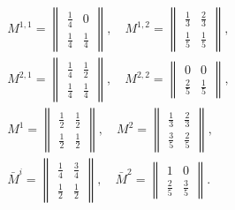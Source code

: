 \documentclass[10pt]{article}
\begin{document}
\[

\begin{aligned}

& M^{1,1}=\left\|\begin{array}{ll}

\frac{1}{4} & 0 \\

\frac{1}{4} & \frac{1}{4}

\end{array}\right\|, \quad M^{1,2}=\left\|\begin{array}{cc}

\frac{1}{3} & \frac{2}{3} \\

\frac{1}{5} & \frac{1}{5}

\end{array}\right\|, \\

& M^{2,1}=\left\|\begin{array}{ll}

\frac{1}{4} & \frac{1}{2} \\

\frac{1}{4} & \frac{1}{4}

\end{array}\right\|, \quad M^{2,2}=\left\|\begin{array}{cc}

0 & 0 \\

\frac{2}{5} & \frac{1}{5}

\end{array}\right\| \text {, } \\

& M^{1}=\left\|\begin{array}{ll}

\frac{1}{2} & \frac{1}{2} \\

\frac{1}{2} & \frac{1}{2}

\end{array}\right\|, \quad M^{2}=\left\|\begin{array}{cc}

\frac{1}{3} & \frac{2}{3} \\

\frac{3}{5} & \frac{2}{5}

\end{array}\right\|, \\

& \bar{M}^{i}=\left\|\begin{array}{cc}

\frac{1}{4} & \frac{3}{4} \\

\frac{1}{2} & \frac{1}{2}

\end{array}\right\|, \quad \bar{M}^{2}=\left\|\begin{array}{cc}

1 & 0 \\

\frac{2}{5} & \frac{3}{5}

\end{array}\right\| .

\end{aligned}

\]
\end{document}
